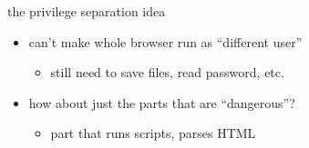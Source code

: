 
\begin{frame}{the privilege separation idea}
    \begin{itemize}
    \item can't make whole browser run as ``different user''
        \begin{itemize}
        \item still need to save files, read password, etc.
        \end{itemize}
    \item how about just the parts that are ``dangerous''?
        \begin{itemize}
        \item part that runs scripts, parses HTML
        \end{itemize}
    \end{itemize}
\end{frame}


